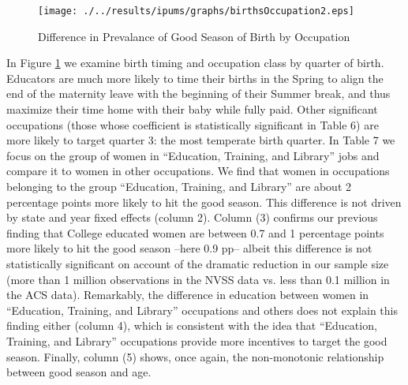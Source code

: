 \documentclass[a4paper, 12 pt]{article}
\theoremstyle{plain}
\begin{document}
\begin{doublespace}
\begin{figure}[htpb!]
\begin{center}
  \centering
  \caption{Difference in Prevalance of Good Season of Birth by Occupation}
  \texttt{[image: ./../results/ipums/graphs/birthsOccupation2.eps]}
  \label{fig:goodByOcc2}
\end{center}
\vspace{-5mm}
\end{figure}

In Figure \ref{fig:goodByOcc2} we examine birth timing and occupation class by quarter of birth. Educators are much more likely to time their births in the Spring to align the end of the maternity leave with the beginning of their Summer break, and thus maximize their time home with their baby while fully paid. Other significant occupations (those whose coefficient is statistically significant in Table 6) are more likely to target quarter 3: the most temperate birth quarter. In Table 7 we focus on the group of women in ``Education, Training, and Library'' jobs and compare it to women in other occupations. We find that women in occupations belonging to the group ``Education, Training, and Library'' are about 2 percentage points more likely to hit the good season. This difference is not driven by state and year fixed effects (column 2). Column (3) confirms our previous finding that College educated women are between 0.7 and 1 percentage points more likely to hit the good season --here 0.9 pp-- albeit this difference is not statistically significant on account of the dramatic reduction in our sample size (more than 1 million observations in the NVSS data vs. less than 0.1 million in the ACS data). Remarkably, the difference in education between women in ``Education, Training, and Library'' occupations and others  does not explain this finding either (column 4), which is consistent with the idea that ``Education, Training, and Library'' occupations provide more incentives to target the good season. Finally, column (5) shows, once again, the non-monotonic relationship between good season and age.


\end{doublespace}
\end{document}
